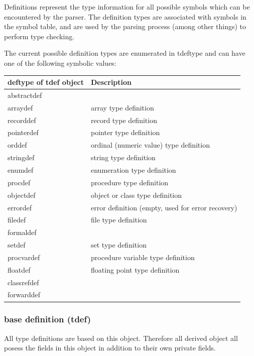 \documentclass [12pt]{article}
\begin{document}
Definitions represent the type information for all possible symbols which 
can be encountered by the parser. The definition types are associated with 
symbols in the symbol table, and are used by the parsing process (among 
other things) to perform type checking.

The current possible definition types are enumerated in \textsf{tdeftype 
}and can have one of the following symbolic values:

\begin{longtable}{|l|p{10cm}|}
\hline
deftype of tdef object	& Description \\
\hline
\endhead
\hline
\endfoot
\textsf{abstractdef}	&  \\
\textsf{arraydef}	& array type definition \\
\textsf{recorddef}	& record type definition \\
\textsf{pointerdef}	& pointer type definition \\
\textsf{orddef}		& ordinal (numeric value) type definition \\
\textsf{stringdef}	& string type definition \\
\textsf{enumdef}	& enumeration type definition \\
\textsf{procdef}	& procedure type definition \\
\textsf{objectdef}	& object or class type definition \\
\textsf{errordef}	& error definition (empty, used for error recovery) \\
\textsf{filedef}	& file type definition \\
\textsf{formaldef}	&  \\
\textsf{setdef}		& set type definition \\
\textsf{procvardef}	& procedure variable type definition \\
\textsf{floatdef}	& floating point type definition \\
\textsf{classrefdef}	&  \\
\textsf{forwarddef}	&  \\
\end{longtable}

\subsubsection{base definition (tdef)}
\label{subsubsec:mylabel5}

All type definitions are based on this object. Therefore all derived object 
all posess the fields in this object in addition to their own private 
fields.
\end{document}
